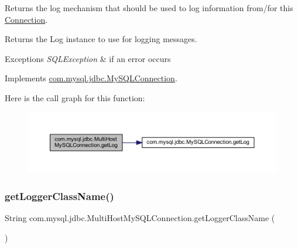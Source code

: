 Returns the log mechanism that should be used to log information from/for this \mbox{\hyperlink{interfacecom_1_1mysql_1_1jdbc_1_1_connection}{Connection}}.

\begin{DoxyReturn}{Returns}
the Log instance to use for logging messages. 
\end{DoxyReturn}

\begin{DoxyExceptions}{Exceptions}
{\em S\+Q\+L\+Exception} & if an error occurs \\
\hline
\end{DoxyExceptions}


Implements \mbox{\hyperlink{interfacecom_1_1mysql_1_1jdbc_1_1_my_s_q_l_connection_a3faf787772351caedf8e95f28c09c4cd}{com.\+mysql.\+jdbc.\+My\+S\+Q\+L\+Connection}}.

Here is the call graph for this function\+:
\nopagebreak
\begin{figure}[H]
\begin{center}
\leavevmode
\includegraphics[width=350pt]{classcom_1_1mysql_1_1jdbc_1_1_multi_host_my_s_q_l_connection_aa844db76fbc95ba7a185cf4df1257800_cgraph}
\end{center}
\end{figure}
\mbox{\label{classcom_1_1mysql_1_1jdbc_1_1_multi_host_my_s_q_l_connection_a8b34b98a48ebd5bc0d397017926d007d}} 
\subsubsection{\texorpdfstring{get\+Logger\+Class\+Name()}{getLoggerClassName()}}
{\footnotesize\ttfamily String com.\+mysql.\+jdbc.\+Multi\+Host\+My\+S\+Q\+L\+Connection.\+get\+Logger\+Class\+Name (\begin{DoxyParamCaption}{ }\end{DoxyParamCaption})}

